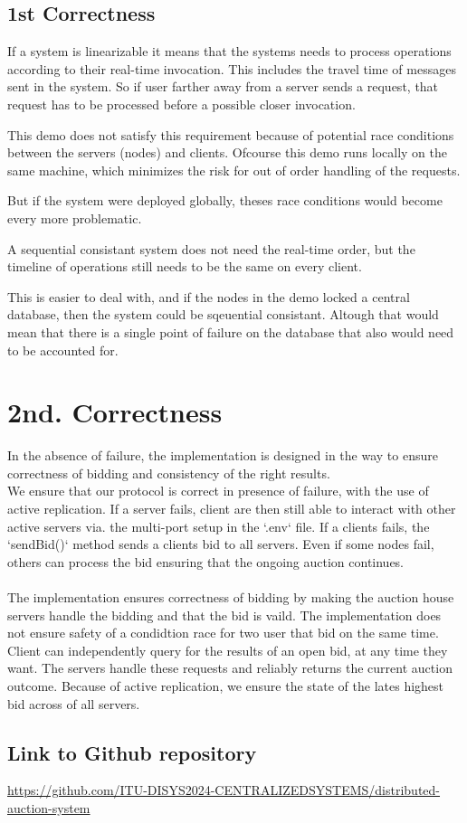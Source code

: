 \documentclass[a4paper,11pt]{article}
\begin{document}
\subsection{1st Correctness}
If a system is linearizable it means that the systems needs to process operations according to their real-time invocation.
This includes the travel time of messages sent in the system. So if user farther away from a server sends a request,
that request has to be processed before a possible closer invocation.

This demo does not satisfy this requirement because of potential race conditions between the servers (nodes) and clients.
Ofcourse this demo runs locally on the same machine, which minimizes the risk for out of order handling of the requests.

But if the system were deployed globally, theses race conditions would become every more problematic.


A sequential consistant system does not need the real-time order, but the timeline of operations still needs to be the same on every client.

This is easier to deal with, and if the nodes in the demo locked a central database, then the system could be sqeuential consistant.
Altough that would mean that there is a single point of failure on the database that also would need to be accounted for.

\section{2nd. Correctness}
In the absence of failure, the implementation is designed in the way to ensure correctness of bidding and consistency of the right results.
\\
We ensure that our protocol is correct in presence of failure, with the use of active replication. 
If a server fails, client are then still able to interact with other active servers via. the multi-port setup in the `.env` file.
If a clients fails, the `sendBid()` method sends a clients bid to all servers. Even if some nodes fail, others can process the bid ensuring that the ongoing auction continues.
\\
\\
The implementation ensures correctness of bidding by making the auction house servers handle the bidding and that the bid is vaild. The implementation does not ensure safety of a condidtion race for two user that bid on the same time.
\\
Client can independently query for the results of an open bid, at any time they want. The servers handle these requests and reliably returns the current auction outcome. Because of active replication, we ensure the state of the lates highest bid across of all servers.  
\\

\subsection*{Link to Github repository}

\href{https://github.com/ITU-DISYS2024-CENTRALIZEDSYSTEMS/distributed-auction-system}{https://github.com/ITU-DISYS2024-CENTRALIZEDSYSTEMS/distributed-auction-system}
\end{document}
